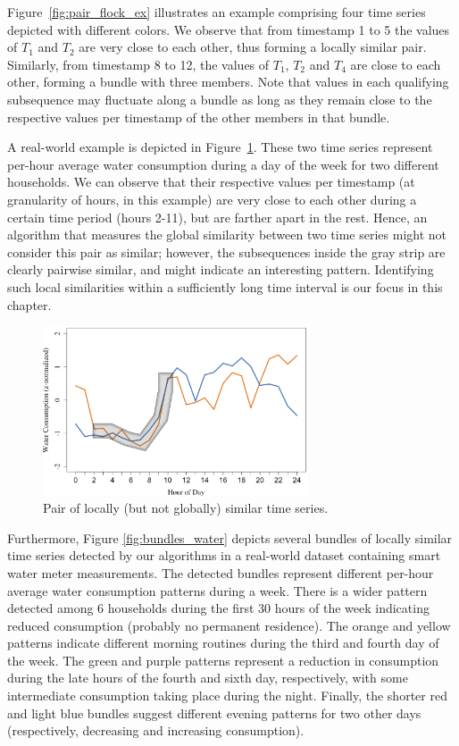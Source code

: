 Figure~\ref{fig:pair_flock_ex} illustrates an example comprising four time series depicted with different colors. We observe that from timestamp 1 to 5 the values of $T_1$ and $T_2$ are very close to each other, thus forming a locally similar pair. Similarly, from timestamp 8 to 12, the values of $T_1$, $T_2$ and $T_4$ are close to each other, forming a bundle with three members. Note that values in each qualifying subsequence may fluctuate along a bundle as long as they remain close to the respective values per timestamp of the other members in that bundle.

A real-world example is depicted in Figure~\ref{fig:water_real_ex}. These two time series represent per-hour average water consumption during a day of the week for two different households. We can observe that their respective values per timestamp (at granularity of hours, in this example) are very close to each other during a certain time period (hours 2-11), but are farther apart in the rest. Hence, an algorithm that measures the global similarity between two time series might not consider this pair as similar; however, the subsequences inside the gray strip are clearly pairwise similar, and might indicate an interesting pattern. Identifying such local similarities within a sufficiently long time interval is our focus in this chapter.

\begin{figure}[!tb]
    \centering
    \includegraphics[width=0.7\textwidth]{figures/water_real_ex.png}
    \caption{Pair of locally (but not globally) similar time series.} 
    \label{fig:water_real_ex}
\end{figure}

Furthermore, Figure \ref{fig:bundles_water} depicts several bundles of locally similar time series detected by our algorithms in a real-world dataset containing smart water meter measurements. The detected bundles represent different per-hour average water consumption patterns during a week. There is a wider pattern detected among 6 households during the first 30 hours of the week indicating reduced consumption (probably no permanent residence). The orange and yellow patterns indicate different morning routines during the third and fourth day of the week. The green and purple patterns represent a reduction in consumption during the late hours of the fourth and sixth day, respectively, with some intermediate consumption taking place during the night. Finally, the shorter red and light blue bundles suggest different evening patterns for two other days (respectively, decreasing and increasing consumption).

